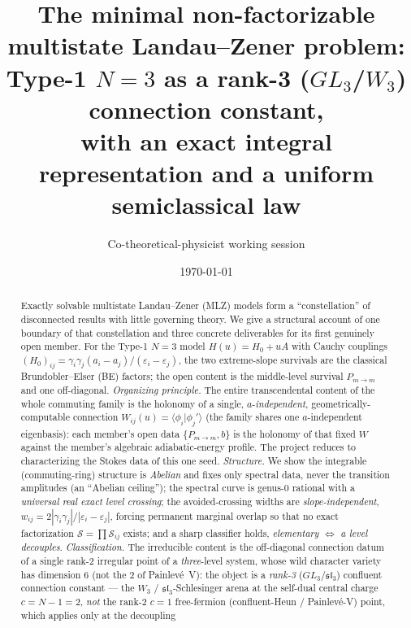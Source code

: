\documentclass[aps,prd,reprint,nofootinbib]{revtex4-2}
\newcommand{\eps}{\varepsilon}
\newcommand{\Scat}{\mathcal{S}}   %
\newcommand{\Pmid}{P_{m\to m}}   %
\begin{document}
\title{The minimal non-factorizable multistate Landau--Zener problem:\\
Type-1 $N{=}3$ as a rank-3 ($GL_3$/$W_3$) connection constant,\\
with an exact integral representation and a uniform semiclassical law}
\author{Co-theoretical-physicist working session}
\date{\today}

\begin{abstract}
Exactly solvable multistate Landau--Zener (MLZ) models form a ``constellation'' of disconnected
results with little governing theory. We give a structural account of one boundary of that
constellation and three concrete deliverables for its first genuinely open member. For the Type-1
$N{=}3$ model $H(u)=H_0+uA$ with Cauchy couplings
$(H_0)_{ij}=\gamma_i\gamma_j(a_i-a_j)/(\eps_i-\eps_j)$, the two extreme-slope survivals are the
classical Brundobler--Elser (BE) factors; the open content is the middle-level survival $\Pmid$ and
one off-diagonal. \emph{Organizing principle.} The entire transcendental content of the whole
commuting family is the holonomy of a single, $a$-\emph{independent}, geometrically-computable
connection $W_{ij}(u)=\langle\phi_i|\phi_j'\rangle$ (the family shares one $a$-independent eigenbasis):
each member's open data $\{\Pmid,b\}$ is the holonomy of that fixed $W$ against the member's algebraic
adiabatic-energy profile. The project reduces to characterizing the Stokes data of this one seed.
\emph{Structure.} We show the integrable (commuting-ring) structure is
\emph{Abelian} and fixes only spectral data, never the transition amplitudes (an ``Abelian
ceiling''); the spectral curve is genus-0 rational with a \emph{universal real exact level
crossing}; the avoided-crossing widths are \emph{slope-independent},
$w_{ij}=2|\gamma_i\gamma_j|/|\eps_i-\eps_j|$, forcing permanent marginal overlap so that no exact
factorization $\Scat=\prod\Scat_{ij}$ exists; and a sharp classifier holds, \emph{elementary
$\Leftrightarrow$ a level decouples}. \emph{Classification.} The irreducible content is the
off-diagonal connection datum of a single rank-2 irregular point of a \emph{three}-level system,
whose wild character variety has dimension $6$ (not the $2$ of Painlev\'e~V): the object is a
\emph{rank-3} ($GL_3$/$\mathfrak{sl}_3$) confluent connection constant --- the $W_3$ /
$\mathfrak{sl}_3$-Schlesinger arena at the self-dual central charge $c=N-1=2$, \emph{not} the rank-2
$c{=}1$ free-fermion (confluent-Heun / Painlev\'e-V) point, which applies only at the decoupling

\end{abstract}
\end{document}

